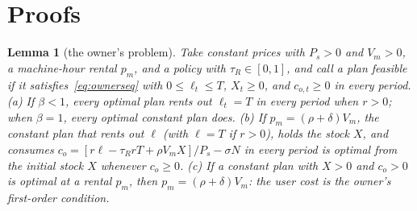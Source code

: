 \documentclass[12pt]{article}
\theoremstyle{plain}
\newtheorem{lemma}{Lemma}
\theoremstyle{definition}
\theoremstyle{remark}
\begin{document}
\appendix
{}

\section{Proofs}\label{app:proofs}

\begin{lemma}[the owner's problem]\label{lem:owner}
Take constant prices with $P_s>0$ and $V_m>0$, a machine-hour rental $p_m$, and a policy with $\tau_R\in[0,1]$, and call a plan feasible if it satisfies~\eqref{eq:ownerseq} with $0\le\ell_t\le T$, $X_t\ge0$, and $c_{o,t}\ge0$ in every period.
(a) If $\beta<1$, every optimal plan rents out $\ell_t=T$ in every period when $r>0$; when $\beta=1$, every optimal constant plan does.
(b) If $p_m=(\rho+\delta)V_m$, the constant plan that rents out $\ell$ (with $\ell=T$ if $r>0$), holds the stock $X$, and consumes $c_o=[r\ell-\tau_RrT+\rho V_mX]/P_s-\sigma N$ in every period is optimal from the initial stock $X$ whenever $c_o\ge0$.
(c) If a constant plan with $X>0$ and $c_o>0$ is optimal at a rental $p_m$, then $p_m=(\rho+\delta)V_m$: the user cost is the owner's first-order condition.
\end{lemma}
\end{document}
